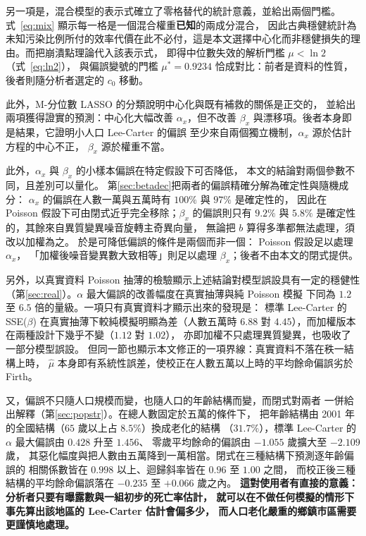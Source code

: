 \documentclass[UTF8, fontset=macnew, a4paper, 12pt]{ctexart}
\begin{document}
另一項是，混合模型的表示式確立了零格替代的統計意義，並給出兩個門檻。
式~\eqref{eq:mix} 顯示每一格是一個混合權重\textbf{已知}的兩成分混合，
因此古典穩健統計為未知污染比例所付的效率代價在此不必付，這是本文選擇中心化而非穩健損失的理由。而把崩潰點理論代入該表示式，
即得中位數失效的解析門檻 $\mu<\ln2$（式~\eqref{eq:ln2}），
與偏誤變號的門檻 $\mu^\ast=0.9234$ 恰成對比：前者是資料的性質，
後者則隨分析者選定的 $c_0$ 移動。

此外，M-分位數 LASSO 的分類說明中心化與既有補救的關係是正交的，
並給出兩項獲得證實的預測：中心化大幅改善 $\alpha_x$，但不改善
$\beta_x$ 與漂移項。後者本身即是結果，它證明小人口 Lee-Carter 的偏誤
至少來自兩個獨立機制，$\alpha_x$ 源於估計方程的中心不正，
$\beta_x$ 源於權重不當。

此外，$\alpha_x$ 與 $\beta_x$ 的小樣本偏誤在特定假設下可否降低，
本文的結論對兩個參數不同，且差別可以量化。
第\ref{sec:betadec}把兩者的偏誤精確分解為確定性與隨機成分：
$\alpha_x$ 的偏誤在人數一萬與五萬時有 $100\%$ 與 $97\%$ 是確定性的，
因此在 Poisson 假設下可由閉式近乎完全移除；$\beta_x$ 的偏誤則只有
$9.2\%$ 與 $5.8\%$ 是確定性的，其餘來自異質變異噪音旋轉主奇異向量，
無論把 $b$ 算得多準都無法處理，須改以加權為之。
於是可降低偏誤的條件是兩個而非一個： Poisson 假設足以處理 $\alpha_x$，
「加權後噪音變異數大致相等」則足以處理 $\beta_x$；後者不由本文的閉式提供。

另外，以真實資料 Poisson 抽薄的檢驗顯示上述結論對模型誤設具有一定的穩健性
（第\ref{sec:real}）。$\alpha$ 最大偏誤的改善幅度在真實抽薄與純 Poisson 模擬
下同為 $1.2$ 至 $6.5$ 倍的量級。一項只有真實資料才顯示出來的發現是：
標準 Lee-Carter 的 SSE($\beta$) 在真實抽薄下較純模擬明顯為差（人數五萬時 $6.88$
對 $4.45$），而加權版本在兩種設計下幾乎不變（$1.12$ 對 $1.02$），
亦即加權不只處理異質變異，也吸收了一部分模型誤設。
但同一節也顯示本文修正的一項界線：真實資料不落在秩一結構上時，
$\hat\mu$ 本身即有系統性誤差，使校正在人數五萬以上時的平均餘命偏誤劣於
Firth。

又，偏誤不只隨人口規模而變，也隨人口的年齡結構而變，而閉式對兩者
一併給出解釋（第\ref{sec:popstr}）。在總人數固定於五萬的條件下，
把年齡結構由 2001 年的全國結構（$65$ 歲以上占 $8.5\%$）換成老化的結構
（$31.7\%$），標準 Lee-Carter 的 $\alpha$ 最大偏誤由 $0.428$ 升至 $1.456$、
零歲平均餘命的偏誤由 $-1.055$ 歲擴大至 $-2.109$ 歲，
其惡化幅度與把人數由五萬降到一萬相當。閉式在三種結構下預測逐年齡偏誤的
相關係數皆在 $0.998$ 以上、迴歸斜率皆在 $0.96$ 至 $1.00$ 之間，
而校正後三種結構的平均餘命偏誤落在 $-0.235$ 至 $+0.066$ 歲之內。
\textbf{這對使用者有直接的意義：分析者只要有曝露數與一組初步的死亡率估計，
就可以在不做任何模擬的情形下事先算出該地區的 Lee-Carter 估計會偏多少，
而人口老化嚴重的鄉鎮市區需要更謹慎地處理。}
\end{document}

